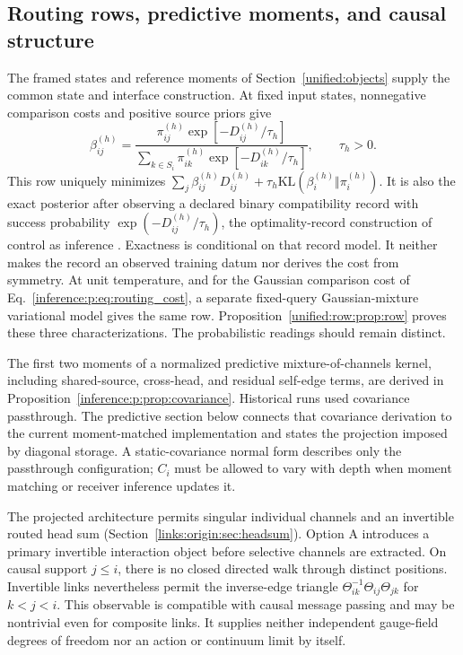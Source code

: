 \documentclass[11pt]{article}
\theoremstyle{definition}
\theoremstyle{remark}
\begin{document}
\subsection{Routing rows, predictive moments, and causal structure}
\label{unified:main_bridge}

The framed states and reference moments of Section~\ref{unified:objects} supply the common state and interface construction. At fixed input states, nonnegative comparison costs and positive source priors give
\begin{equation}
\beta_{ij}^{(h)}=\frac{\pi_{ij}^{(h)}\exp[-D_{ij}^{(h)}/\tau_h]}{\sum_{k\in S_i}\pi_{ik}^{(h)}\exp[-D_{ik}^{(h)}/\tau_h]}, \qquad \tau_h>0.
\label{unified:source_row}
\end{equation}
This row uniquely minimizes $\sum_j\beta_{ij}^{(h)}D_{ij}^{(h)}+\tau_h\mathrm{KL}(\beta_i^{(h)}\Vert\pi_i^{(h)})$. It is also the exact posterior after observing a declared binary compatibility record with success probability $\exp(-D_{ij}^{(h)}/\tau_h)$, the optimality-record construction of control as inference \cite{unified:levine2018}. Exactness is conditional on that record model. It neither makes the record an observed training datum nor derives the cost from symmetry. At unit temperature, and for the Gaussian comparison cost of Eq.~\eqref{inference:p:eq:routing_cost}, a separate fixed-query Gaussian-mixture variational model gives the same row. Proposition~\ref{unified:row:prop:row} proves these three characterizations. The probabilistic readings should remain distinct.

The first two moments of a normalized predictive mixture-of-channels kernel, including shared-source, cross-head, and residual self-edge terms, are derived in Proposition~\ref{inference:p:prop:covariance}. Historical runs used covariance passthrough. The predictive section below connects that covariance derivation to the current moment-matched implementation and states the projection imposed by diagonal storage. A static-covariance normal form describes only the passthrough configuration; $C_i$ must be allowed to vary with depth when moment matching or receiver inference updates it.

The projected architecture permits singular individual channels and an invertible routed head sum (Section~\ref{links:origin:sec:headsum}). Option A introduces a primary invertible interaction object before selective channels are extracted. On causal support $j\le i$, there is no closed directed walk through distinct positions. Invertible links nevertheless permit the inverse-edge triangle $\Theta_{ik}^{-1}\Theta_{ij}\Theta_{jk}$ for $k<j<i$. This observable is compatible with causal message passing and may be nontrivial even for composite links. It supplies neither independent gauge-field degrees of freedom nor an action or continuum limit by itself.
\end{document}
